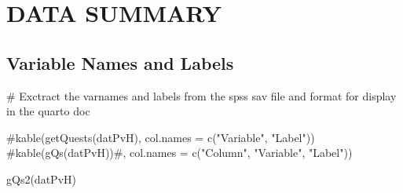 \documentclass[
  letterpaper,
  DIV=11,
  numbers=noendperiod]{scrartcl}
\newenvironment{Shaded}{\begin{snugshade}}{\end{snugshade}}
\newcommand{\CommentTok}[1]{\textcolor[rgb]{0.37,0.37,0.37}{#1}}
\newcommand{\FunctionTok}[1]{\textcolor[rgb]{0.28,0.35,0.67}{#1}}
\newcommand{\NormalTok}[1]{\textcolor[rgb]{0.00,0.23,0.31}{#1}}
\begin{document}
\section{DATA SUMMARY}\label{data-summary}

\subsection{Variable Names and Labels}\label{variable-names-and-labels}

\begin{Shaded}
\begin{Highlighting}[]
\CommentTok{\# Exctract the varnames and labels from the spss sav file and format for display in the quarto doc}

\CommentTok{\#kable(getQuests(datPvH), col.names = c("Variable", "Label"))}
\CommentTok{\#kable(gQs(datPvH))\#, col.names = c("Column", "Variable", "Label"))}

\FunctionTok{gQs2}\NormalTok{(datPvH)}
\end{Highlighting}
\end{Shaded}
\end{document}
